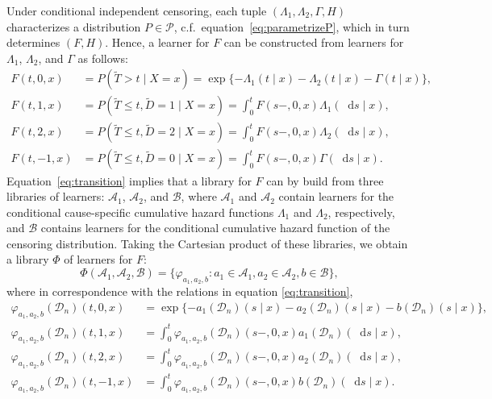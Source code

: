\documentclass[alpha-refs]{wiley-article}
\renewcommand{\phi}{\varphi}
\newcommand*\diff{\mathop{}\!\mathrm{d}}
\newcommand{\1}{\mathds{1}}
\newcommand{\data}{\ensuremath{\mathcal{D}}}
\begin{document}
Under conditional independent censoring, each tuple
$(\Lambda_{1}, \Lambda_{2}, \Gamma, H)$ characterizes a distribution
\(P\in\mathcal P\), c.f.\ equation~\eqref{eq:parametrizeP}, which in
turn determines \( (F, H) \). Hence, a learner for \( F \) can be
constructed from learners for \( \Lambda_1 \), \( \Lambda_2 \), and
$\Gamma$ as follows:
\begin{equation}\label{eq:transition}
  \begin{split}
    F(t, 0, x)
    &
      = P(\tilde{T} > t \mid X= x)
      =
      \exp{{\{-\Lambda_{1}(t \mid x)-\Lambda_{2}(t \mid x) - \Gamma(t \mid x)\}
      }},
    \\
    F(t, 1, x)
    &
      = P(\tilde{T} \leq t, \tilde{D}=1 \mid X=x)
      = \int_0^t F(s-, 0, x)  \Lambda_{1}(\diff s \mid x),
    \\
    F(t, 2, x)
    &
      = P(\tilde{T} \leq t, \tilde{D}=2 \mid X=x)
      = \int_0^t  F(s-, 0, x)  \Lambda_{2}(\diff s \mid x),
    \\
    F(t, -1, x)
    &
      = P(\tilde{T} \leq t, \tilde{D}=0 \mid X=x)
      = \int_0^t F(s-, 0, x)  \Gamma(\diff s \mid x).
  \end{split}
\end{equation}
Equation~\eqref{eq:transition} implies that a library for \( F \) can
by build from three libraries of learners: \(\mathcal{A}_1\),
\( \mathcal{A}_2 \), and \( \mathcal{B} \), where \(\mathcal{A}_1\)
and \( \mathcal{A}_2\) contain learners for the conditional
cause-specific cumulative hazard functions \(\Lambda_1\) and
\( \Lambda_2\), respectively, and \(\mathcal{B}\) contains learners
for the conditional cumulative hazard function of the censoring
distribution.  Taking the Cartesian product of these libraries, we
obtain a library $\Phi$ of learners for \( F \):
\begin{equation}
  \label{eq:jssl-lib-def}
  \Phi(\mathcal{A}_1, \mathcal{A}_2, \mathcal{B})
  = \{ \phi_{a_1,a_2, b} : a_1 \in \mathcal{A}_1, a_2 \in \mathcal{A}_2, b \in \mathcal{B}\},
\end{equation}
where in correspondence with the relations in equation
\eqref{eq:transition},
\begin{equation}
  \begin{split}\label{eq:anti-transition}
    \phi_{a_1,a_2, b}(\data_n)(t,0,x)
  &= \exp{\{-a_1(\data_n)(s \mid x)-a_2(\data_n)(s \mid x) - b(\data_n)(s \mid
    x)\} },
  \\
  \phi_{a_1,a_2, b}(\data_n)(t,1,x)
  &= \int_0^t
    \phi_{a_1,a_2, b}(\data_n)(s-,0,x)  a_1(\data_n)(\diff s \mid x),
  \\
  \phi_{a_1,a_2, b}(\data_n)(t,2,x)
  &= \int_0^t\phi_{a_1,a_2, b}(\data_n)(s-,0,x)  a_2(\data_n)(\diff s \mid x),
  \\
  \phi_{a_1,a_2, b}(\data_n)(t,-1,x)
  &= \int_0^t \phi_{a_1,a_2, b}(\data_n)(s-,0,x)  b(\data_n)(\diff s \mid x).
  \end{split}
\end{equation}
\end{document}
